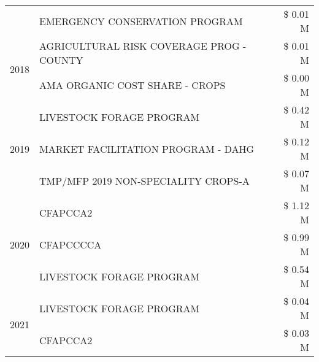 \begin{tabular}{llr}
 & EMERGENCY CONSERVATION PROGRAM & \$ 0.01 M \\
\cline{1-3}
\multirow[t]{2}{*}{2018} & AGRICULTURAL RISK COVERAGE PROG - COUNTY & \$ 0.01 M \\
 & AMA ORGANIC COST SHARE - CROPS & \$ 0.00 M \\
\cline{1-3}
\multirow[t]{3}{*}{2019} & LIVESTOCK FORAGE PROGRAM & \$ 0.42 M \\
 & MARKET FACILITATION PROGRAM - DAHG & \$ 0.12 M \\
 & TMP/MFP 2019 NON-SPECIALITY CROPS-A & \$ 0.07 M \\
\cline{1-3}
\multirow[t]{3}{*}{2020} & CFAPCCA2 & \$ 1.12 M \\
 & CFAPCCCCA & \$ 0.99 M \\
 & LIVESTOCK FORAGE PROGRAM & \$ 0.54 M \\
\cline{1-3}
\multirow[t]{2}{*}{2021} & LIVESTOCK FORAGE PROGRAM & \$ 0.04 M \\
 & CFAPCCA2 & \$ 0.03 M \\
\cline{1-3}
\bottomrule
\end{tabular}
